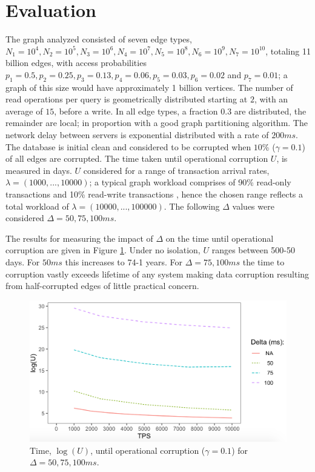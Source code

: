 \section{Evaluation}
\label{sec:evaluation}

The graph analyzed consisted of seven edge types, $N_1=10^4, N_2=10^5, N_3=10^6, N_4=10^7,  N_5=10^8, N_6=10^9, N_7=10^{10}$, totaling 11 billion edges, with access probabilities $p_1 =0.5, p_2 =0.25, p_3=0.13, p_4=0.06, p_5=0.03, p_6=0.02$ and $p_7 =0.01$; a graph of this size would have approximately 1 billion vertices. The number of read operations per query is geometrically distributed starting at $2$, with an average of $15$, before a write. In all edge types, a fraction $0.3$ are distributed, the remainder are local; in proportion with a good graph partitioning algorithm. The network delay between servers is exponential distributed with a rate of $200ms$. The database is initial clean and considered to be corrupted when $10$\% ($\gamma = 0.1$) of all edges are corrupted. The time taken until operational corruption $U$, is measured in days. $U$ considered for a range of transaction arrival rates, $\lambda = (1000, ..., 10000)$; a typical graph workload comprises of 90\% read-only transactions and 10\% read-write transactions \cite{Angles2020}, hence the chosen range reflects a total workload of $\lambda = (10000, ..., 100000)$. The following $\Delta$ values were considered $\Delta = 50, 75, 100ms$.

The results for measuring the impact of $\Delta$ on the time until operational corruption are given in Figure \ref{time-to-corruption-results}. Under no isolation, $U$ ranges between 500-50 days. For $50ms$ this increases to 74-1 years. For $\Delta = 75, 100ms$ the time to corruption vastly exceeds lifetime of any system making data corruption resulting from half-corrupted edges of little practical concern.

\begin{figure}[h]
  \centering
  \includegraphics[width=\linewidth]{./figures/delta_50_75_100}
  \caption{Time, $\log(U)$, until operational corruption ($\gamma = 0.1$) for $\Delta = 50, 75, 100ms$.}
  \label{time-to-corruption-results}
\end{figure}

